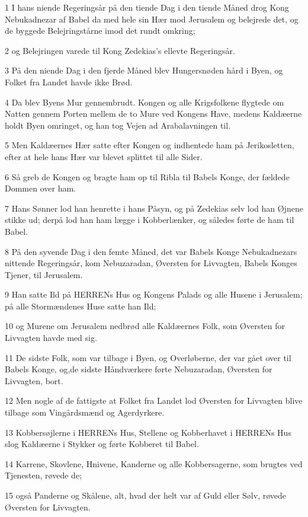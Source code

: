 \par 1 I hans niende Regeringsår på den tiende Dag i den tiende Måned drog Kong Nebukadnezar af Babel da med hele sin Hær mod Jerusalem og belejrede det, og de byggede Belejringstårne imod det rundt omkring;
\par 2 og Belejringen varede til Kong Zedekias's ellevte Regeringsår.
\par 3 På den niende Dag i den fjerde Måned blev Hungersnøden hård i Byen, og Folket fra Landet havde ikke Brød.
\par 4 Da blev Byens Mur gennembrudt. Kongen og alle Krigsfolkene flygtede om Natten gennem Porten mellem de to Mure ved Kongens Have, medens Kaldæerne holdt Byen omringet, og han tog Vejen ad Arabalavningen til.
\par 5 Men Kaldæernes Hær satte efter Kongen og indhentede ham på Jerikosletten, efter at hele hans Hær var blevet splittet til alle Sider.
\par 6 Så greb de Kongen og bragte ham op til Ribla til Babels Konge, der fældede Dommen over ham.
\par 7 Hans Sønner lod han henrette i hans Påsyn, og på Zedekias selv lod han Øjnene stikke ud; derpå lod han ham lægge i Kobberlænker, og således førte de ham til Babel.
\par 8 På den syvende Dag i den femte Måned, det var Babels Konge Nebukadnezars nittende Regeringsår, kom Nebuzaradan, Øversten for Livvagten, Babels Konges Tjener, til Jerusalem.
\par 9 Han satte Ild på HERRENs Hus og Kongens Palads og alle Husene i Jerusalem; på alle Stormændenes Huse satte han Ild;
\par 10 og Murene om Jerusalem nedbrød alle Kaldæernes Folk, som Øversten for Livvagten havde med sig.
\par 11 De sidste Folk, som var tilbage i Byen, og Overløberne, der var gået over til Babels Konge, og,de sidste Håndværkere førte Nebuzaradan, Øversten for Livvagten, bort.
\par 12 Men nogle af de fattigste at Folket fra Landet lod Øversten for Livvagten blive tilbage som Vingårdsmænd og Agerdyrkere.
\par 13 Kobbersøjlerne i HERRENs Hus, Stellene og Kobberhavet i HERRENs Hus slog Kaldæerne i Stykker og førte Kobberet til Babel.
\par 14 Karrene, Skovlene, Hnivene, Kanderne og alle Kobbersagerne, som brugtes ved Tjenesten, røvede de;
\par 15 også Panderne og Skålene, alt, hvad der helt var af Guld eller Sølv, røvede Øversten for Livvagten.
